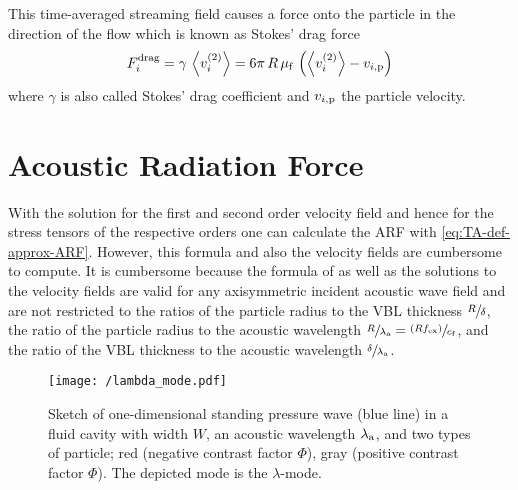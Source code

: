 
This time-averaged streaming field causes a force onto the particle in the 
direction of the flow which is known as Stokes' drag force
\begin{equation}
  F^{\mathrm{drag}}_{i} = \gamma\,\left\langle v_{i}^{(2)} \right\rangle = 
  6\pi\,R\,\mu_{\mathrm{f}}\,
  \left( \left\langle v_{i}^{(2)} \right\rangle - v_{i,\mathrm{p}} \right)
  \label{eq:TA-drag-force}
\end{equation}
where $\gamma$ is also called Stokes' drag coefficient and $v_{i,\mathrm{p}}$ 
the particle velocity.


\section{Acoustic Radiation Force\label{sec:TA-ARF}}

With the solution for the first and second order velocity field and hence for 
the stress tensors of the respective orders one can calculate the ARF with 
\cref{eq:TA-def-approx-ARF}. However, this formula and also the velocity fields 
are cumbersome to compute. It is cumbersome because the formula of 
 as well as the solutions to the velocity fields are 
valid for any axisymmetric incident acoustic wave field and are not restricted 
to the ratios of the particle radius to the VBL thickness $\sfrac{R}{\delta}$, 
the ratio of the particle radius to the acoustic wavelength 
$\sfrac{R}{\lambda_{\mathrm{a}}} = \sfrac{(Rf_{\mathrm{ex}})}{c_{\mathrm{f}}}$, and the ratio of 
the VBL thickness to the acoustic wavelength 
$\sfrac{\delta}{\lambda_{\mathrm{a}}}$.

\begin{figure}[tbp]
  \centering
  \texttt{[image: /lambda\_mode.pdf]}
  \caption{Sketch of one-dimensional standing pressure wave (blue line) in a 
      fluid cavity with width $W$, an acoustic wavelength 
      $\lambda_{\mathrm{a}}$, and two types of particle; red (negative contrast 
      factor $\Phi$), gray (positive contrast factor $\Phi$). The depicted mode 
    is the $\lambda$-mode.}
  \label{fig:TA-lambda_mode}
\end{figure}

